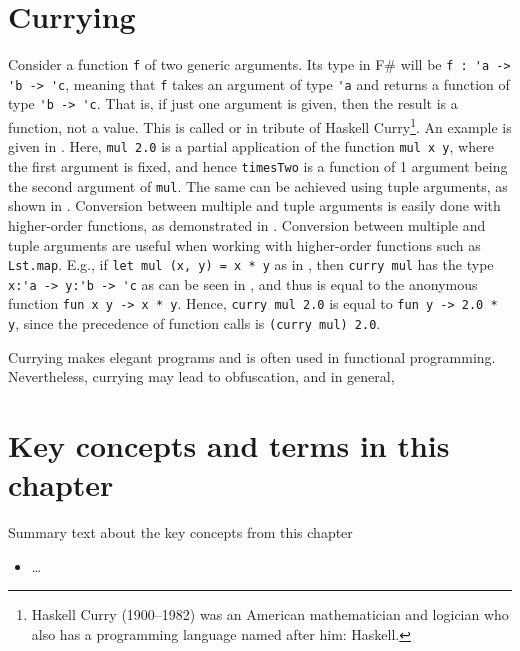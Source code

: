 \documentclass[springer.tex]{subfiles}
\begin{document}
\section{Currying}
Consider a function \lstinline{f} of two generic arguments. Its type in F\# will be \lstinline{f : 'a -> 'b -> 'c}, meaning that \lstinline{f} takes an argument of type \lstinline{'a} and returns a function of type \lstinline{'b -> 'c}. That is, if just one argument is given, then the result is a function, not a value. This is called  or  in tribute of Haskell Curry\footnote{Haskell Curry (1900--1982) was an American mathematician and logician who also has a programming language named after him: Haskell.}. An example is given in .
%
%
Here, \lstinline{mul 2.0} is a partial application of the function \lstinline{mul x y}, where the first argument is fixed, and hence \lstinline{timesTwo} is a function of 1 argument being the second argument of \lstinline{mul}. The same can be achieved using tuple arguments, as shown in .
%
%
Conversion between multiple and tuple arguments is easily done with higher-order functions, as demonstrated in .
%
%
Conversion between multiple and tuple arguments are useful when working with higher-order functions such as \lstinline{Lst.map}. E.g., if \lstinline{let mul (x, y) = x * y} as in , then \lstinline{curry mul} has the type \lstinline{x:'a -> y:'b -> 'c} as can be seen in , and thus is equal to the anonymous function \lstinline{fun x y -> x * y}. Hence, \lstinline{curry mul 2.0} is equal to \lstinline{fun y -> 2.0 * y}, since the precedence of function calls is \lstinline{(curry mul) 2.0}. 

Currying makes elegant programs and is often used in functional programming. Nevertheless, currying may lead to obfuscation, and in general, 

\section{Key concepts and terms in this chapter}
Summary text about the key concepts from this chapter
\begin{itemize}
\item \ldots
\end{itemize}
\end{document}
